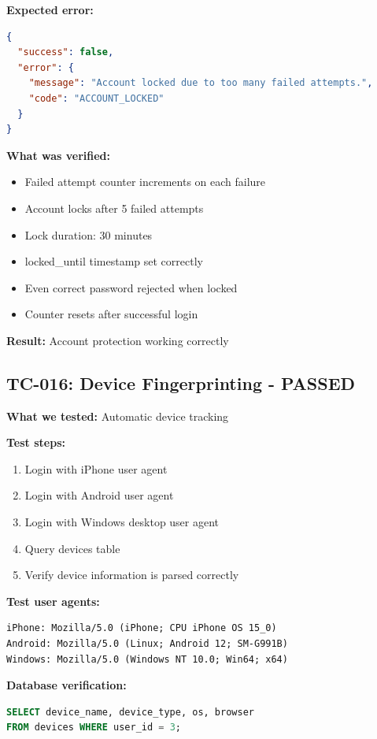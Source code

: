 \documentclass[11pt,a4paper]{article}
\begin{document}
\textbf{Expected error:}
\begin{lstlisting}[language=json]
{
  "success": false,
  "error": {
    "message": "Account locked due to too many failed attempts.",
    "code": "ACCOUNT_LOCKED"
  }
}
\end{lstlisting}

\textbf{What was verified:}
\begin{itemize}
    \item Failed attempt counter increments on each failure
    \item Account locks after 5 failed attempts
    \item Lock duration: 30 minutes
    \item locked\_until timestamp set correctly
    \item Even correct password rejected when locked
    \item Counter resets after successful login
\end{itemize}

\textbf{Result:} Account protection working correctly

\subsection{TC-016: Device Fingerprinting - PASSED}
\textbf{What we tested:} Automatic device tracking

\textbf{Test steps:}
\begin{enumerate}
    \item Login with iPhone user agent
    \item Login with Android user agent
    \item Login with Windows desktop user agent
    \item Query devices table
    \item Verify device information is parsed correctly
\end{enumerate}

\textbf{Test user agents:}
\begin{lstlisting}
iPhone: Mozilla/5.0 (iPhone; CPU iPhone OS 15_0)
Android: Mozilla/5.0 (Linux; Android 12; SM-G991B)
Windows: Mozilla/5.0 (Windows NT 10.0; Win64; x64)
\end{lstlisting}

\textbf{Database verification:}
\begin{lstlisting}[language=sql]
SELECT device_name, device_type, os, browser 
FROM devices WHERE user_id = 3;
\end{lstlisting}
\end{document}
